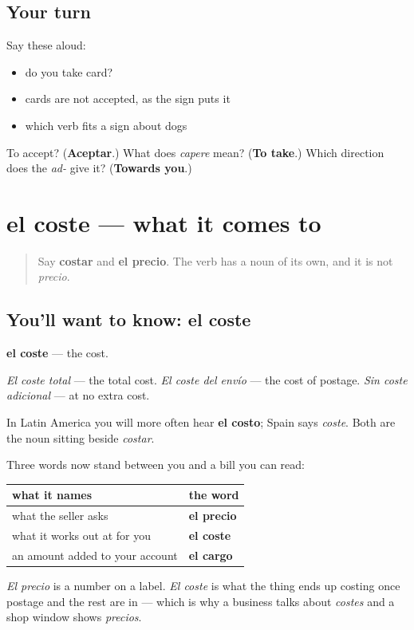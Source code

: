 \subsection*{Your turn}
Say these aloud:

\begin{itemize}
\raggedright
  \item do you take card?
  \item cards are not accepted, as the sign puts it
  \item which verb fits a sign about dogs
\end{itemize}

\begin{tcolorbox}[breakable,colback=teal!4,colframe=teal!35!black,title={Before you move on}]
To accept? (\textbf{Aceptar}.) What does \emph{capere} mean? (\textbf{To take}.) Which direction does the \emph{ad-} give it? (\textbf{Towards you}.)
\end{tcolorbox}
\section[el coste]{el coste — what it comes to}

\label{lesson:ES-C456-coste}



\begin{quote}
Say \textbf{costar} and \textbf{el precio}. The verb has a noun of its own, and it is not \emph{precio}.
\end{quote}

\subsection*{You'll want to know: el coste}
\textbf{el coste} — the cost.

\emph{El coste total} — the total cost. \emph{El coste del envío} — the cost of postage. \emph{Sin coste adicional} — at no extra cost.

In Latin America you will more often hear \textbf{el costo}; Spain says \emph{coste}. Both are the noun sitting beside \emph{costar}.

\begin{grammarlens}[title={Grammar Lens: coste, precio, cargo}]
Three words now stand between you and a bill you can read:

\noindent
\begin{tabularx}{\linewidth}{@{}>{\raggedright\arraybackslash}X>{\raggedright\arraybackslash}X@{}}
\toprule
\textbf{what it names} & \textbf{the word} \\
\midrule
what the seller asks & \textbf{el precio} \\
what it works out at for you & \textbf{el coste} \\
an amount added to your account & \textbf{el cargo} \\
\bottomrule
\end{tabularx}

\emph{El precio} is a number on a label. \emph{El coste} is what the thing ends up costing once postage and the rest are in — which is why a business talks about \emph{costes} and a shop window shows \emph{precios}.
\end{grammarlens}

